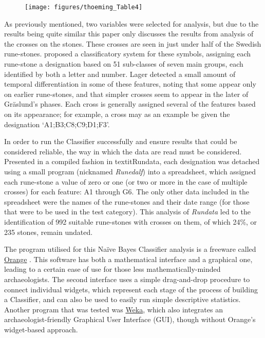 	\begin{figure}[!htb]
		\texttt{[image: figures/thoeming\_Table4]}
		\centering
		\label{fig:Table4}
	\end{figure}

As previously mentioned, two variables were selected for analysis, but due to the results being quite similar this paper only discusses the results from analysis of the crosses on the stones. These crosses are seen in just under half of the Swedish rune-stones. \textcite{Lager_2002} proposed a classificatory system for these symbols, assigning each rune-stone a designation based on 51 sub-classes of seven main groups, each identified by both a letter and number. Lager detected a small amount of temporal differentiation in some of these features, noting that some appear only on earlier rune-stones, and that simpler crosses seem to appear in the later of Gräslund’s phases. Each cross is generally assigned several of the features based on its appearance; for example, a cross may as an example be given the designation ‘A1;B3;C8;C9;D1;F3’. 

In order to run the Classifier successfully and ensure results that could be considered reliable, the way in which the data are read must be considered. Presented in a compiled fashion in textit{Rundata}, each designation was detached using a small program (nicknamed \textit{Runedalf}) into a spreadsheet, which assigned each rune-stone a value of zero or one (or two or more in the case of multiple crosses) for each feature: A1 through G6. The only other data included in the spreadsheet were the names of the rune-stones and their date range (for those that were to be used in the test category). This analysis of \textit{Rundata} led to the identification of 992 suitable rune-stones with crosses on them, of which 24\%, or 235 stones, remain undated. 

The program utilised for this Naïve Bayes Classifier analysis is a freeware called \href{http://orange.biolab.si/}{Orange} \parencite{Demsar_2004}. This software has both a mathematical interface and a graphical one, leading to a certain ease of use for those less mathematically-minded archaeologists. The second interface uses a simple drag-and-drop procedure to connect individual widgets, which represent each stage of the process of building a Classifier, and can also be used to easily run simple descriptive statistics. Another program that was tested was \href{http://www.cs.waikato.ac.nz/ml/weka/}{Weka}, which also integrates an archaeologist-friendly Graphical User Interface (GUI), though without Orange’s widget-based approach.

